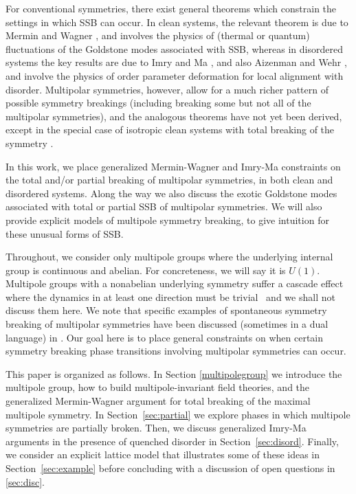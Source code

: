 \documentclass[pra,aps,twocolumn, amsfonts,amsmath,amssymb,nofootinbib,superscriptaddress]{revtex4-2}
\begin{document}
For conventional symmetries, there exist general theorems which constrain the settings in which SSB can occur. In clean systems, the relevant theorem is due to Mermin and Wagner \cite{MerminWagner}, and involves the physics of (thermal or quantum) fluctuations of the Goldstone modes associated with SSB, whereas in disordered systems the key results are due to Imry and Ma \cite{ImryMa, Vojta2013}, and also Aizenman and Wehr \cite{Aizenman}, and involve the physics of order parameter deformation for local alignment with disorder. Multipolar symmetries, however, allow for a much richer pattern of possible symmetry breakings (including breaking some but not all of the multipolar symmetries), and the analogous theorems have not yet been derived, except in the special case of isotropic clean systems with total breaking of the symmetry \cite{Griffin2013Multi}.

In this work, we place generalized Mermin-Wagner and Imry-Ma constraints on the total and/or partial breaking of multipolar symmetries, in both clean and disordered systems. Along the way we also discuss the exotic Goldstone modes associated with total or partial SSB of multipolar symmetries. We will also provide explicit models of multipole symmetry breaking, to give intuition for these unusual forms of SSB. 

Throughout, we consider only multipole groups where the underlying internal group is continuous and abelian. For concreteness, we will say it is $U(1)$. Multipole groups with a nonabelian underlying symmetry suffer a cascade effect where the dynamics in at least one direction must be trivial~\cite{nonabelian} and we shall not discuss them here. We note that specific examples of spontaneous symmetry breaking of multipolar symmetries have been discussed (sometimes in a dual language) in \cite{elastic1, elastic2, elastic3, elastic4, elastic5, FS1, FS2}. Our goal here is to place general constraints on when certain symmetry breaking phase transitions involving multipolar symmetries can occur. 

This paper is organized as follows. In Section \ref{multipolegroup} we introduce the multipole group, how to build multipole-invariant field theories, and the generalized Mermin-Wagner argument for total breaking of the maximal multipole symmetry. In Section~\ref{sec:partial} we explore phases in which multipole symmetries are partially broken.
Then, we discuss generalized Imry-Ma arguments in the presence of quenched disorder in Section~\ref{sec:disord}. Finally, we consider an explicit lattice model that illustrates some of these ideas in Section~\ref{sec:example} before concluding with a discussion of open questions in \ref{sec:disc}.
\end{document}
